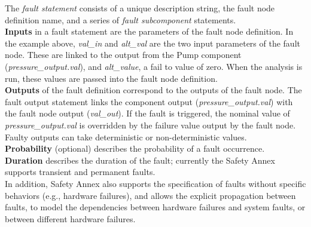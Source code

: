 The \textit{fault statement} consists of a unique description string, the fault node definition name, and a series of \textit{fault subcomponent} statements. \\
\textbf{Inputs} in a fault statement are the parameters of the fault node definition. In the example above, \textit{val\_in} and \textit{alt\_val} are the two input parameters of the fault node. These are linked to the output from the Pump component (\textit{pressure\_output.val}), and \textit{alt\_value}, a fail to value of zero. When the analysis is run, these values are passed into the fault node definition.\\
\textbf{Outputs} of the fault definition correspond to the outputs of the fault node. The fault output statement links the component output (\textit{pressure\_output.val}) with the fault node output (\textit{val\_out}). If the fault is triggered, the nominal value of \textit{pressure\_output.val} is overridden by the failure value output by the fault node. Faulty outputs can take deterministic or non-deterministic values. \\
\textbf{Probability} (optional) describes the probability of a fault occurrence.\\
\textbf{Duration} describes the duration of the fault; currently the Safety Annex supports transient and permanent faults.\\
In addition, Safety Annex also supports the specification of faults without specific behaviors (e.g., hardware failures), and allows the explicit propagation between faults, to model the dependencies between hardware failures and system faults, or between different hardware failures.

